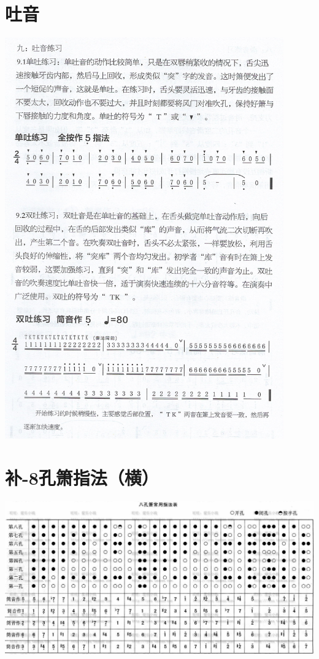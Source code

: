 \documentclass[cn,pad,twocol]{elegantbook}
\begin{document}
\section{吐音}
    \includegraphics[width=0.9\textwidth]{dongxiao/Scan 15.jpeg}
\section{补-8孔箫指法（横）} \center
    \includegraphics[width=0.94\textheight, angle=90]{dongxiao/20200817-8孔箫指法-横}
\end{document}

